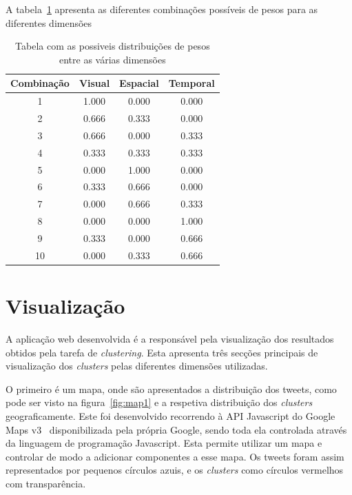 
A tabela~\ref{tab:pesos} apresenta as diferentes combinações possíveis de pesos para as diferentes dimensões

\begin{table}[h]
\centering
\begin{tabular}{|c|c|c|c|}
\hline
\textbf{Combinação} & \textbf{Visual} & \textbf{Espacial} & \textbf{Temporal} \\ \hline
1 & 1.000 & 0.000 & 0.000 \\ \hline
2 & 0.666 & 0.333 & 0.000 \\ \hline
3 & 0.666 & 0.000 & 0.333 \\ \hline
4 & 0.333 & 0.333 & 0.333 \\ \hline
5 & 0.000 & 1.000 & 0.000 \\ \hline
6 & 0.333 & 0.666 & 0.000 \\ \hline
7 & 0.000 & 0.666 & 0.333 \\ \hline
8 & 0.000 & 0.000 & 1.000 \\ \hline
9 & 0.333 & 0.000 & 0.666 \\ \hline
10 & 0.000 & 0.333 & 0.666 \\ \hline
\end{tabular}
\vspace{2 mm}
\caption{Tabela com as possiveis distribuições de pesos entre as várias dimensões}
\label{tab:pesos}
\end{table}

\section{Visualização}

A aplicação web desenvolvida é a responsável pela visualização dos resultados obtidos pela tarefa de \textit{clustering}. Esta apresenta três secções principais de visualização dos \textit{clusters} pelas diferentes dimensões utilizadas. 

O primeiro é um mapa, onde são apresentados a distribuição dos tweets, como pode ser visto na figura~\ref{fig:map1} e a respetiva distribuição dos \textit{clusters} geograficamente. Este foi desenvolvido recorrendo à API Javascript do Google Maps v3~\cite{googlemapsapi} disponibilizada pela própria Google, sendo toda ela controlada através da linguagem de programação Javascript. Esta permite utilizar um mapa e controlar de modo a adicionar componentes a esse mapa. Os tweets foram assim representados por pequenos círculos azuis, e os \textit{clusters} como círculos vermelhos com transparência. 

